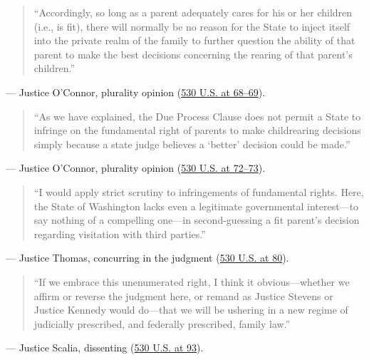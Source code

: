 \documentclass[12pt]{article}
\begin{document}
\begin{quote}
``Accordingly, so long as a parent adequately cares for his or her children (i.e., is fit), there will normally be no reason for the State to inject itself into the private realm of the family to further question the ability of that parent to make the best decisions concerning the rearing of that parent's children.''
\end{quote}
\noindent --- Justice O'Connor, plurality opinion (\href{https://www.law.cornell.edu/supremecourt/text/99-138}{530 U.S. at 68--69}).

\begin{quote}
``As we have explained, the Due Process Clause does not permit a State to infringe on the fundamental right of parents to make childrearing decisions simply because a state judge believes a `better' decision could be made.''
\end{quote}
\noindent --- Justice O'Connor, plurality opinion (\href{https://www.law.cornell.edu/supremecourt/text/99-138}{530 U.S. at 72--73}).

\begin{quote}
``I would apply strict scrutiny to infringements of fundamental rights. Here, the State of Washington lacks even a legitimate governmental interest---to say nothing of a compelling one---in second-guessing a fit parent's decision regarding visitation with third parties.''
\end{quote}
\noindent --- Justice Thomas, concurring in the judgment (\href{https://www.law.cornell.edu/supremecourt/text/99-138}{530 U.S. at 80}).

\begin{quote}
``If we embrace this unenumerated right, I think it obvious---whether we affirm or reverse the judgment here, or remand as Justice Stevens or Justice Kennedy would do---that we will be ushering in a new regime of judicially prescribed, and federally prescribed, family law.''
\end{quote}
\noindent --- Justice Scalia, dissenting (\href{https://www.law.cornell.edu/supremecourt/text/99-138}{530 U.S. at 93}).
\end{document}
